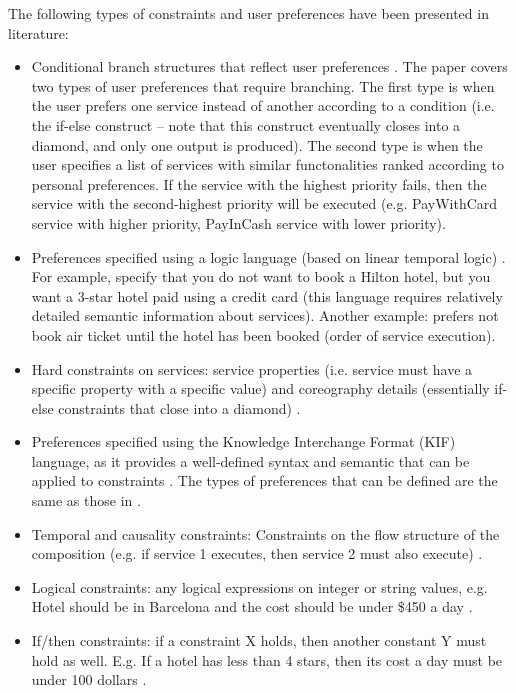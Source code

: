 The following types of constraints and user preferences have been presented in literature:

\begin{itemize}
 \item Conditional branch structures that reflect user preferences \cite{wang2014automated}. The paper covers two types of user preferences that require branching. The first type is when the user prefers one service instead of another according to a condition (i.e. the if-else construct -- note that this construct eventually closes into a diamond, and only one output is produced). The second type is when the user specifies a list of services with similar functonalities ranked according to personal preferences. If the service with the highest priority fails, then the service with the second-highest priority will be executed (e.g. PayWithCard service with higher priority, PayInCash service with lower priority).
 \item Preferences specified using a logic language (based on linear temporal logic) \cite{sohrabi2009web}. For example, specify that you do not want to book a Hilton hotel, but you want a 3-star hotel paid using a credit card (this language requires relatively detailed semantic information about services). Another example: prefers not book air ticket until the hotel has been booked (order of service execution).
 \item Hard constraints on services: service properties (i.e. service must have a specific property with a specific value) and coreography details (essentially if-else constraints that close into a diamond) \cite{boustil2010web}.
 \item Preferences specified using the Knowledge Interchange Format (KIF) language, as it provides a well-defined syntax and semantic that can be applied to constraints \cite{gamha2008framework}. The types of preferences that can be defined are the same as those in \cite{sohrabi2009web}.
 \item Temporal and causality constraints: Constraints on the flow structure of the composition (e.g. if service 1 executes, then service 2 must also execute) \cite{karakoc2009composing}.
 \item Logical constraints: any logical expressions on integer or string values, e.g. Hotel should be in Barcelona and the cost should be under \$450 a day \cite{karakoc2009composing}.
 \item If/then constraints: if a constraint X holds, then another constant Y must hold as well. E.g. If a hotel has less than 4 stars, then its cost a day must be under 100 dollars \cite{karakoc2009composing}.

\end{itemize}
